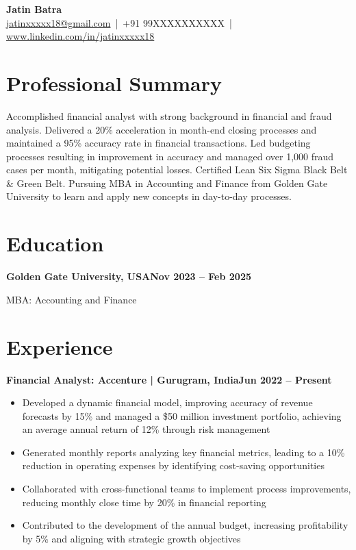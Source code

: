 \documentclass[11pt,a4paper]{article}
\newcommand{\entry}[2]{\noindent\textbf{#1}\hfill\textbf{#2}\par\vspace{2pt}}
\begin{document}
\begin{center}
  {\fontsize{22}{26}\selectfont\bfseries\color{heading} Jatin Batra}\\[5pt]
  {\large
   \href{mailto:jatinxxxxx18@gmail.com}{jatinxxxxx18@gmail.com} \,|\, +91 99XXXXXXXXXX \,|\,
   \href{https://www.linkedin.com/in/jatinxxxxx18}{www.linkedin.com/in/jatinxxxxx18}}
\end{center}
\vspace{-15pt}
\noindent\makebox[\linewidth][c]{\color{black}\rule{\paperwidth}{0.6pt}}
\vspace{-18pt}

\section{Professional Summary}
\normalsize
Accomplished financial analyst with strong background in financial and fraud analysis.
Delivered a 20\% acceleration in month-end closing processes and maintained a 95\% accuracy
rate in financial transactions. Led budgeting processes resulting in improvement in accuracy
and managed over 1,000 fraud cases per month, mitigating potential losses. Certified Lean Six
Sigma Black Belt \& Green Belt. Pursuing MBA in Accounting and Finance from Golden Gate
University to learn and apply new concepts in day-to-day processes.

\section{Education}
\normalsize
\entry{Golden Gate University, USA}{Nov 2023 -- Feb 2025}
MBA: Accounting and Finance

\section{Experience}
\normalsize
\entry{Financial Analyst: Accenture | Gurugram, India}{Jun 2022 -- Present}
\begin{itemize}
  \item Developed a dynamic financial model, improving accuracy of revenue forecasts by 15\% and
        managed a \$50 million investment portfolio, achieving an average annual return of 12\%
        through risk management
  \item Generated monthly reports analyzing key financial metrics, leading to a 10\% reduction in
        operating expenses by identifying cost-saving opportunities
  \item Collaborated with cross-functional teams to implement process improvements, reducing
        monthly close time by 20\% in financial reporting
  \item Contributed to the development of the annual budget, increasing profitability by 5\% and
        aligning with strategic growth objectives
\end{itemize}
\end{document}
